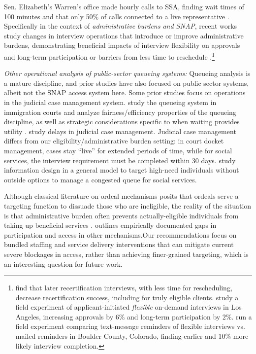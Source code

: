 \documentclass[manuscript,screen,authorversion]{acmart}
\begin{document}
Sen. Elizabeth's Warren's office made hourly calls to SSA, finding wait times of 100 minutes and that only 50\% of calls connected to a live representative \citep{warren}. Specifically in the context of \textit{administrative burdens and SNAP}, recent works study changes in interview operations that introduce or improve administrative burdens, demonstrating beneficial impacts of interview flexibility on approvals and long-term participation \citep{giannella2024administrative,kim2025administrative} or barriers from less time to reschedule \citep{homonoff2021program}.\footnote{\citet{homonoff2021program} find that later recertification interviews, with less time for rescheduling, decrease recertification success, including for truly eligible clients. %
\citet{giannella2024administrative} study a field experiment of applicant-initiated \textit{flexible} on-demand interviews in Los Angeles, increasing approvals by $6\%$ and long-term participation by $2\%.$ \citet{kim2025administrative} run a field experiment comparing text-message reminders of flexible interviews vs. mailed reminders in Boulder County, Colorado, finding earlier and 10\% more likely interview completion.  }

\textit{Other operational analysis of public-sector queueing systems:} 
Queueing analysis is a mature discipline, and prior studies have also focused on public sector systems, albeit not the SNAP access system here. Some prior studies focus on operations in the judicial case management system. \citet{freund2024dedicated} study the queueing system in immigration courts and analyze fairness/efficiency properties of the queueing discipline, as well as strategic considerations specific to when waiting provides utility \citep{freund2025regulating}. \citet{bakshi2025service} study delays in judicial case management. Judicial case management differs from our eligibility/administrative burden setting: in court docket management, cases stay ``live'' for extended periods of time, while for social services, the interview requirement must be completed within 30 days. \citet{anunrojwong2023information} study information design in a general model to target high-need individuals without outside options to manage a congested queue for social services. 

Although classical literature on ordeal mechanisms \citep{nichols1982targeting} posits that ordeals serve a targeting function to dissuade those who are ineligible, the reality of the situation is that administrative burden \citep{herd2025administrative} often prevents actually-eligible individuals from taking up beneficial services \citet{homonoff2021program}. \citep{garg2025heterogeneous} outlines empirically documented gaps in participation and access in other mechanisms.Our recommendations focus on bundled staffing and service delivery interventions that can mitigate current severe blockages in access, rather than achieving finer-grained targeting, which is an interesting question for future work. 
\end{document}

